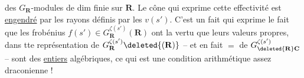 des $G_{\mathbf R}$-modules de dim finie sur $\mathbf R$. Le cône qui exprime cette effectivité est \uline{engendré} par les  rayons définis par les $v(s')$. C'est un fait qui exprime  le fait que les frobénius $f(s')\in G_{\mathbf R}^{\zeta(s')}(\mathbf R)$ ont la vertu que leurs valeurs propres, dans tte représentation de $G_{\mathbf R}^{\zeta(s')}\deleted{(\mathbf R)}$ -- et en fait $=$ de $G_{\deleted{\mathbf R}\mathbf C}^{\zeta(s')}$ -- sont des \uline{entiers} algébriques, ce qui est une condition arithmétique assez draconienne !
